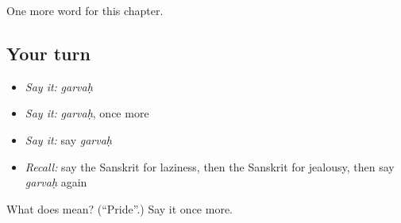 \begin{grammarlens}[title={What you've built}]
One more word for this chapter.
\end{grammarlens}

\subsection*{Your turn}
\begin{itemize}
\raggedright
  \item \emph{Say it:} \emph{garvaḥ}
  \item \emph{Say it:} \emph{garvaḥ}, once more
  \item \emph{Say it:} say \emph{garvaḥ}
  \item \emph{Recall:} say the Sanskrit for laziness, then the Sanskrit for jealousy, then say \emph{garvaḥ} again
\end{itemize}

\begin{tcolorbox}[breakable,colback=teal!4,colframe=teal!35!black,title={Before you move on}]
What does  mean? (\textquotedblleft{}Pride\textquotedblright{}.) Say it once more.
\end{tcolorbox}
